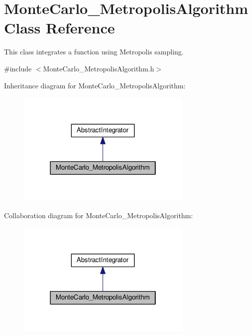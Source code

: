 \hypertarget{class_monte_carlo___metropolis_algorithm}{}\section{Monte\+Carlo\+\_\+\+Metropolis\+Algorithm Class Reference}
\label{class_monte_carlo___metropolis_algorithm}


This class integrates a function using Metropolis sampling.  




{\ttfamily \#include $<$Monte\+Carlo\+\_\+\+Metropolis\+Algorithm.\+h$>$}



Inheritance diagram for Monte\+Carlo\+\_\+\+Metropolis\+Algorithm\+:\nopagebreak
\begin{figure}[H]
\begin{center}
\leavevmode
\includegraphics[width=238pt]{class_monte_carlo___metropolis_algorithm__inherit__graph}
\end{center}
\end{figure}


Collaboration diagram for Monte\+Carlo\+\_\+\+Metropolis\+Algorithm\+:\nopagebreak
\begin{figure}[H]
\begin{center}
\leavevmode
\includegraphics[width=238pt]{class_monte_carlo___metropolis_algorithm__coll__graph}
\end{center}
\end{figure}
